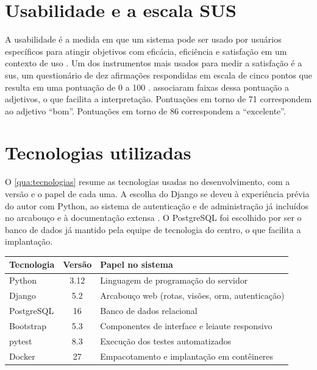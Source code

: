 \section{Usabilidade e a escala SUS}
\label{sec:fundamentacao:usabilidade}

A usabilidade é a medida em que um sistema pode ser usado por usuários
específicos para atingir objetivos com eficácia, eficiência e satisfação em um
contexto de uso \cite{iso2018usability}. Um dos instrumentos mais usados para medir a satisfação é a
\ac{sus}, um questionário de dez afirmações respondidas em escala de cinco
pontos que resulta em uma pontuação de 0 a 100 \cite{brooke1996sus}.
\textcite{bangor2009determining} associaram faixas dessa pontuação a adjetivos,
o que facilita a interpretação. Pontuações em torno de 71 correspondem ao
adjetivo ``bom''. Pontuações em torno de 86 correspondem a ``excelente''.

\section{Tecnologias utilizadas}
\label{sec:fundamentacao:tecnologias}

O \cref{qua:tecnologias} resume as tecnologias usadas no desenvolvimento, com
a versão e o papel de cada uma. A escolha do Django se deveu à experiência
prévia do autor com Python, ao sistema de autenticação e de administração já
incluídos no arcabouço e à documentação extensa
\cite{django2026documentation}. O PostgreSQL foi escolhido por ser o banco de
dados já mantido pela equipe de tecnologia do centro, o que facilita a
implantação.

\begin{quadro}[htbp]
  \centering
  \caption{Tecnologias utilizadas no desenvolvimento}
  \label{qua:tecnologias}
  \small
  \begin{tabularx}{\textwidth}{|l|c|X|}
    \hline
    \textbf{Tecnologia} & \textbf{Versão} & \textbf{Papel no sistema} \\
    \hline
    Python & 3.12 & Linguagem de programação do servidor \\
    \hline
    Django & 5.2 & Arcabouço web (rotas, visões, \acs{orm}, autenticação) \\
    \hline
    PostgreSQL & 16 & Banco de dados relacional \\
    \hline
    Bootstrap & 5.3 & Componentes de interface e leiaute responsivo \\
    \hline
    pytest & 8.3 & Execução dos testes automatizados \\
    \hline
    Docker & 27 & Empacotamento e implantação em contêineres \\
    \hline
  \end{tabularx}
  \fonteautor
\end{quadro}
